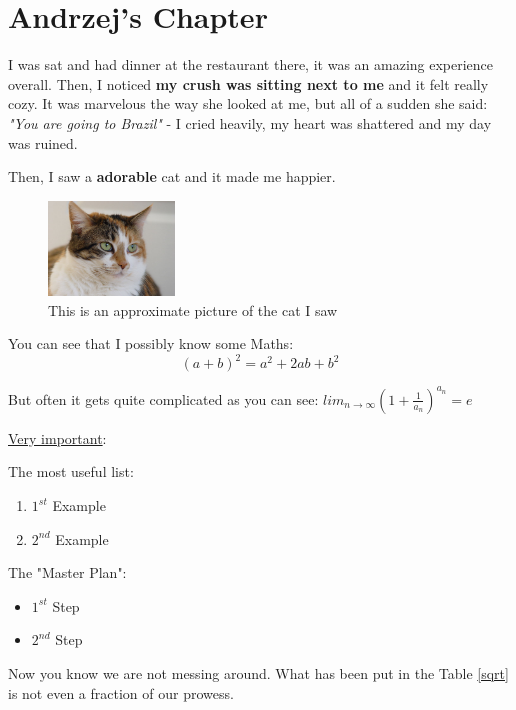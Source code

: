 \section{Andrzej's Chapter}

I was sat and had dinner at the restaurant there, it was an amazing experience overall. Then, I noticed \textbf{my crush was sitting next to me} and it felt really cozy. It was marvelous the way she looked at me, but all of a sudden she said: \emph{"You are going to Brazil"} -  I cried heavily, my heart was shattered and my day was ruined.

Then, I saw a \textbf{adorable} cat and it made me happier.
\begin{figure}[h]
    \centering
    \includegraphics[width=0.3\textwidth]{Pictures/cat.jpg}
    \caption{This is an approximate picture of the cat I saw}
\end{figure}

You can see that I possibly know some Maths: \[(a+b)^2 = a^2 + 2ab + b^2 \]

But often it gets quite complicated as you can see:
$ lim_{n \to \infty} (1+ \frac{1}{a_n})^{a_n} = e $

\underline{Very important}:


\newpage

The most useful list:
\begin{enumerate}
\item $1^{st}$ Example
\item $2^{nd}$ Example
\end{enumerate}

The "Master Plan":
\begin{itemize}
    \item $1^{st}$ Step
    \item $2^{nd}$ Step
\end{itemize}
Now you know we are not messing around. What has been put in the Table \ref{sqrt} is not even a fraction of our prowess.